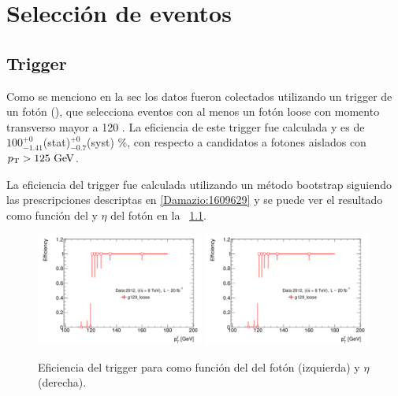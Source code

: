 \chapter{Selección de eventos}

\section{Trigger}\label{sec:trigger}

Como se menciono en la sec los datos fueron colectados utilizando un trigger
de un fotón (\trigchain), que selecciona eventos con al menos un fotón loose con
momento transverso mayor a 120 \gev.
La eficiencia de este trigger fue calculada y es de $100^{+0}_{-1.41}$(stat)${}^{+0}_{-0.7}$(syst) \%,
con respecto a candidatos a fotones aislados con $\pt>125 \gev$.

La eficiencia del trigger fue calculada utilizando un método bootstrap siguiendo las prescripciones
descriptas en \ref{Damazio:1609629} y se puede ver el resultado como función del {\pt} y $\eta$ del
fotón en la {\fig}\ \ref{fig:trigger_perf}.

\begin{figure}[h!]
  \centering
  \includegraphics[width=0.49\textwidth]{figures/EffPtg120_loose}
  \includegraphics[width=0.49\textwidth]{figures/EffPtg120_loose}
  \caption{Eficiencia del trigger para {\trigchain} como función del {\pt} del fotón (izquierda)
    y $\eta$ (derecha).}\label{fig:trigger_perf}
\end{figure}


